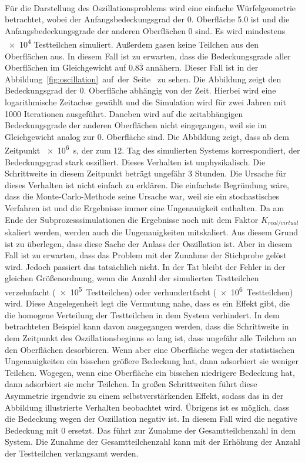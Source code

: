 \documentclass{listhesis}
\begin{document}
\paragraph{}
Für die Darstellung des Oszillationsproblems wird eine einfache Würfelgeometrie betrachtet, wobei der Anfangsbedeckungsgrad der 0. Oberfläche 5.0 ist und die Anfangsbedeckungsgrade der anderen Oberflächen 0 sind. Es wird mindestens \SI{e4}{} Testteilchen simuliert. Außerdem gasen keine Teilchen aus den Oberflächen aus. In diesem Fall ist zu erwarten, dass die Bedeckungsgrade aller Oberflächen im Gleichgewicht auf $0.8\overline{3}$ annähern. Dieser Fall ist in der Abbildung~\ref{fig:oscillation}~auf~der~Seite~\pageref{fig:oscillation} zu sehen. Die Abbildung zeigt den Bedeckungsgrad der 0. Oberfläche abhängig von der Zeit. Hierbei wird eine logarithmische Zeitachse gewählt und die Simulation wird für zwei Jahren mit 1000 Iterationen ausgeführt. Daneben wird auf die zeitabhängigen Bedeckungsgrade der anderen Oberflächen nicht eingegangen, weil sie im Gleichgewicht analog zur 0. Oberfläche sind. Die Abbildung zeigt, dass ab dem Zeitpunkt \SI{e6}{\s}, der zum 12. Tag des simulierten Systems korrespondiert, der Bedeckungsgrad stark oszilliert. Dieses Verhalten ist unphysikalisch. Die Schrittweite in diesem Zeitpunkt beträgt ungefähr 3 Stunden. Die Ursache für dieses Verhalten ist nicht einfach zu erklären. Die einfachste Begründung wäre, dass die Monte-Carlo-Methode seine Ursache war, weil sie ein stochastisches Verfahren ist und die Ergebnisse immer eine Ungenauigkeit enthalten. Da am Ende der Subprozesssimulationen die Ergebnisse noch mit dem Faktor $K_{real/virtual}$ skaliert werden, werden auch die Ungenauigkeiten mitskaliert. Aus diesem Grund ist zu überlegen, dass diese Sache der Anlass der Oszillation ist. Aber in diesem Fall ist zu erwarten, dass das Problem mit der Zunahme der Stichprobe gelöst wird. Jedoch passiert das tatsächlich nicht. In der Tat bleibt der Fehler in der gleichen Größenordnung, wenn die Anzahl der simulierten Testteilchen verzehnfacht (\SI{e5} {Testteilchen}) oder verhundertfacht (\SI{e6}{Testteilchen}) wird. Diese Angelegenheit legt die Vermutung nahe, dass es ein Effekt gibt, die die homogene Verteilung der Testteilchen in dem System verhindert. In dem betrachteten Beispiel kann davon ausgegangen werden, dass die Schrittweite in dem Zeitpunkt des Oszillationsbeginns so lang ist, dass ungefähr alle Teilchen an den Oberflächen desorbieren. Wenn aber eine Oberfläche wegen der statistischen Ungenauigkeiten ein bisschen größere Bedeckung hat, dann adsorbiert sie weniger Teilchen. Wogegen, wenn eine Oberfläche ein bisschen niedrigere Bedeckung hat, dann adsorbiert sie mehr Teilchen. In großen Schrittweiten führt diese Asymmetrie irgendwie zu einem selbstverstärkenden Effekt, sodass das in der Abbildung illustrierte Verhalten beobachtet wird. Übrigens ist es möglich, dass die Bedeckung wegen der Oszillation negativ ist. In diesem Fall wird die negative Bedeckung mit 0 ersetzt. Das führt zur Zunahme der Gesamtteilchenzahl in dem System. Die Zunahme der Gesamtteilchenzahl kann mit der Erhöhung der Anzahl der Testteilchen verlangsamt werden.
\end{document}
